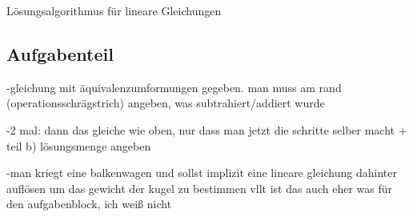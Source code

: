 \documentclass[solution]{uebungsblatt}
\begin{document}
\newpage


\begin{remark}
    Lösungsalgorithmus für lineare Gleichungen
\end{remark}

\subsection*{Aufgabenteil}

-gleichung mit äquivalenzumformungen gegeben. man muss am rand (operationsschrägstrich) angeben, was subtrahiert/addiert wurde

-2 mal: dann das gleiche wie oben, nur dass man jetzt die schritte selber macht + teil b) lösungsmenge angeben 

-man kriegt eine balkenwagen und sollst implizit eine lineare gleichung dahinter auflösen um das gewicht der kugel zu bestimmen vllt ist das auch eher was für den aufgabenblock,
ich weiß nicht

\end{document}
